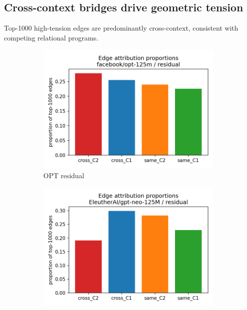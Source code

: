 \documentclass[11pt]{article}
\newcommand{\1}{\mathbf{1}}
\begin{document}
\subsection{Cross-context bridges drive geometric tension}
Top-1000 high-tension edges are predominantly cross-context, consistent with competing relational programs.

\begin{figure}[t]
\centering
\begin{subfigure}[t]{0.32\textwidth}
\includegraphics[width=\linewidth]{figs/edge_attr_props_facebook_opt-125m_residual.png}
\caption{OPT residual}
\end{subfigure}\hfill
\begin{subfigure}[t]{0.32\textwidth}
\includegraphics[width=\linewidth]{figs/edge_attr_props_EleutherAI_gpt-neo-125M_residual.png}

\end{subfigure}
\end{figure}
\end{document}
